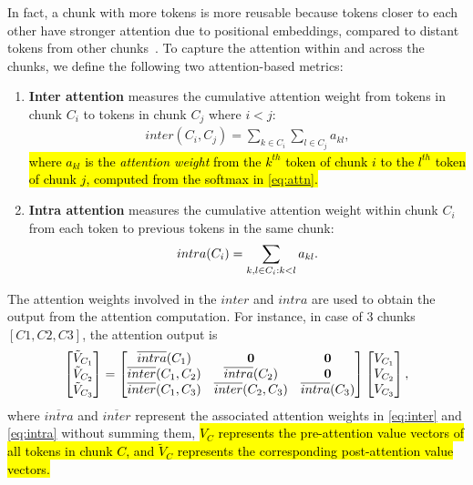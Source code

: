 In fact, a chunk with more tokens is more reusable because tokens closer to each other have stronger attention due to positional embeddings, compared to distant tokens from other chunks~\cite{su2024roformer}. 
To capture the attention within and across the chunks, we define the following two attention-based metrics:

\begin{enumerate}
     \item 
     \textbf{Inter attention} measures the cumulative attention weight from tokens in chunk $C_{i}$ to tokens in chunk $C_{j}$ where $i<j$:
    \begin{align}\label{eq:inter}
        inter(C_{i}, C_{j}) = \sum_{k \in C_{i}} \sum_{l \in C_{j}} a_{kl},
    \end{align}
    \hl{where $a_{kl}$ is the \textit{attention weight} from the $k^{th}$ token of chunk $i$ to the $l^{th}$ token of chunk $j$, computed from the softmax in \eqref{eq:attn}.}
    
    \item 
    \textbf{Intra attention} measures the cumulative attention weight within chunk $C_{i}$ from each token to previous tokens in the same chunk:   
    \begin{align}\label{eq:intra}
    \small
        intra(C_{i}) = \sum_{k,l\in C_{i}: k < l} a_{kl}.
    \end{align}
\end{enumerate}
    
   
The attention weights involved in the $inter$ and $intra$ are used to obtain the output from the attention computation. For instance, in case of $3$ chunks \( [C1, C2, C3] \), the attention output is
{\small
\begin{align}
\begin{bmatrix}
\tilde{V}_{C_1} \\
\tilde{V}_{C_2} \\
\tilde{V}_{C_3}
\end{bmatrix} =
\begin{bmatrix}
\small
\overline{intra}(C_1) & \mathbf{0} & \mathbf{0} \\
\overline{inter}(C_1, C_2) & \overline{intra}(C_2) & \mathbf{0} \\
\overline{inter}(C_1, C_3) & \overline{inter}(C_2, C_3) & \overline{intra}(C_3)
\end{bmatrix}
\begin{bmatrix}
V_{C_1} \\
V_{C_2} \\
V_{C_3}
\end{bmatrix},
\end{align}
}
where $\overline{intra}$ and $\overline{inter}$ represent the associated attention weights in \eqref{eq:inter} and \eqref{eq:intra} without summing them, \hl{$V_C$ represents the pre-attention value vectors of all tokens in chunk $C$, and $\tilde{V}_C$ represents the corresponding post-attention value vectors.}



